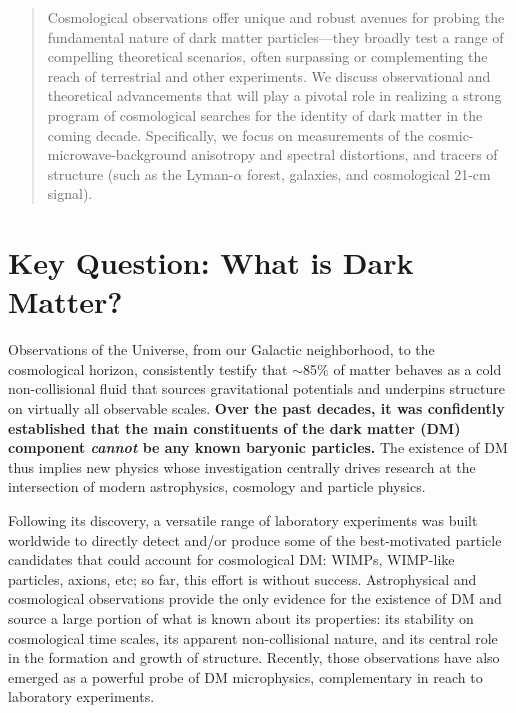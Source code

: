 \documentclass[12pt]{article}
\begin{document}
\begin{abstract}
Cosmological observations offer unique and robust avenues for probing the fundamental nature of dark matter particles---they broadly test a range of compelling theoretical scenarios, often surpassing or complementing the reach of terrestrial and other experiments.
We discuss observational and theoretical advancements that will play a pivotal role in realizing a strong program of cosmological searches for the identity of dark matter in the coming decade. Specifically, we focus on measurements of the cosmic-microwave-background anisotropy and spectral distortions, and tracers of structure (such as the Lyman-$\alpha$ forest, galaxies, and cosmological 21-cm signal).
\end{abstract}

\pagebreak
\section{Key Question: What is Dark Matter?}
 
Observations of the Universe, from our Galactic neighborhood, to the cosmological horizon, consistently testify that $\sim$85$\%$ of matter behaves as a cold non-collisional fluid that sources gravitational potentials and underpins structure on virtually all observable scales.
\textbf{Over the past decades, it was confidently established that the main constituents of the dark matter (DM) component \textit{cannot} be any known baryonic particles.}
The existence of DM thus implies new physics whose investigation centrally drives research at the intersection of modern astrophysics, cosmology and particle physics. 

Following its discovery, a versatile range of laboratory experiments was built worldwide to directly detect and/or produce some of the best-motivated particle candidates that could account for cosmological DM: WIMPs, WIMP-like particles, axions, etc; so far, this effort is without success.
Astrophysical and cosmological observations provide the only evidence for the existence of DM and source a large portion of what is known about its properties: its stability on cosmological time scales, its apparent non-collisional nature, and its central role in the formation and growth of structure.
Recently, those observations have also emerged as a powerful probe of DM microphysics, complementary in reach to laboratory experiments.
\end{document}
